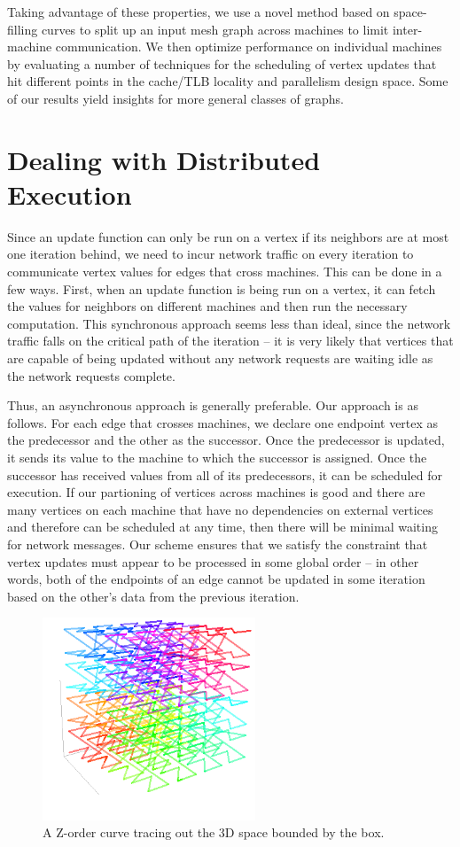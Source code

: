 \documentclass[journal]{IEEEtran}
\begin{document}
Taking advantage of these properties, we use a novel method based on space-filling curves to split up an input mesh graph across machines to limit inter-machine communication. We then optimize performance on individual machines by evaluating a number of techniques for the scheduling of vertex updates that hit different points in the cache/TLB locality and parallelism design space. Some of our results yield insights for more general classes of graphs.


\section{Dealing with Distributed Execution}
Since an update function can only be run on a vertex if its neighbors are at most one iteration behind, we need to incur network traffic on every iteration to communicate vertex values for edges that cross machines. This can be done in a few ways. First, when an update function is being run on a vertex, it can fetch the values for neighbors on different machines and then run the necessary computation. This synchronous approach seems less than ideal, since the network traffic falls on the critical path of the iteration -- it is very likely that vertices that are capable of being updated without any network requests are waiting idle as the network requests complete.

Thus, an asynchronous approach is generally preferable. Our approach is as follows. For each edge that crosses machines, we declare one endpoint vertex as the predecessor and the other as the successor. Once the predecessor is updated, it sends its value to the machine to which the successor is assigned. Once the successor has received values from all of its predecessors, it can be scheduled for execution. If our partioning of vertices across machines is good and there are many vertices on each machine that have no dependencies on external vertices and therefore can be scheduled at any time, then there will be minimal waiting for network messages. Our scheme ensures that we satisfy the constraint that vertex updates must appear to be processed in some global order -- in other words, both of the endpoints of an edge cannot be updated in some iteration based on the other's data from the previous iteration.

\begin{figure}[!t]
\centering
\includegraphics[width=2.5in]{z}
\caption{A Z-order curve tracing out the 3D space bounded by the box.}
\label{fig_z}
\end{figure}
\end{document}

